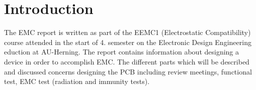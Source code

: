 \chapter{Introduction}
The EMC report is written as part of the EEMC1 (Electrostatic Compatibility) course attended in the start of 4. semester on the Electronic Design Engineering eduction at AU-Herning. The report contains information about designing a device in order to accomplish EMC. The different parts which will be described and discussed concerns designing the PCB including review meetings, functional test, EMC test (radiation and immunity tests).

\newpage